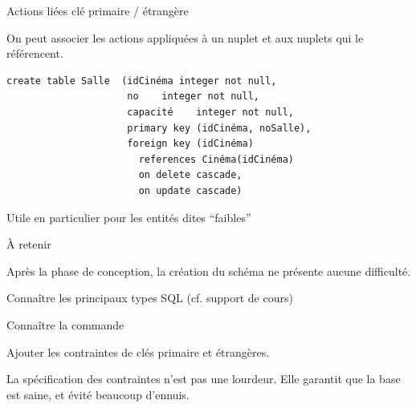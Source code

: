 \begin{frame}[fragile]{Actions liées clé primaire / étrangère}

On peut associer les actions appliquées à un nuplet et aux nuplets
qui le référencent.
\vfill

\begin{verbatim}
create table Salle  (idCinéma integer not null, 
                     no    integer not null,
                     capacité    integer not null,
                     primary key (idCinéma, noSalle),
                     foreign key (idCinéma) 
                       references Cinéma(idCinéma)
                       on delete cascade,
                       on update cascade)
\end{verbatim}

\vfill

\begin{blocgauche}
Utile en particulier pour les entités dites ``faibles''
\end{blocgauche}
\end{frame}
\begin{frame}{À retenir}

Après la phase de conception, la création du schéma ne présente aucune difficulté.
\vfill

\begin{redbullet}
   \item  Connaître les principaux types SQL (cf. support de cours)
   \item Connaître la commande 
   \item Ajouter les contraintes de clés primaire et étrangères.
\end{redbullet}

\vfill

\begin{blocgauche}
La spécification des contraintes n'est pas une lourdeur. Elle garantit que la base est saine,
et évité beaucoup d'ennuis.
\end{blocgauche}
\end{frame}

